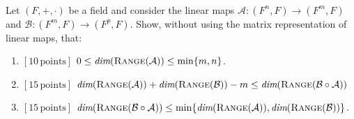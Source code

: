 \documentclass[a4paper,10.5pt]{article}
\def\dim{{\mbox{\em dim}}}
\def\range{{\mbox{\sc Range}}}
\begin{document}
\clearpage

\\
Let $(F, +, \cdot)$ be a field and consider the linear maps $\mathcal{A} : (F^n, F) \rightarrow (F^m, F)$ and  $\mathcal{B} : (F^m, F) \rightarrow (F^p, F)$. Show, without using the matrix representation of linear maps, that:

\begin{enumerate}
	\item {\bf$[10\, \text{points}]$} $0 \leq \dim(\range(\mathcal{A})) \leq \min\{m, n\}$.
	\item {\bf$[15\, \text{points}]$} $\dim(\range(\mathcal{A})) + \dim(\range(\mathcal{B})) - m \leq \dim(\range(\mathcal{B}\circ\mathcal{A}))$
	\item {\bf$[15\, \text{points}]$} $\dim(\range(\mathcal{B}\circ\mathcal{A})) \leq \min\{\dim(\range(\mathcal{A})),\dim(\range(\mathcal{B}))\}$. 
\end{enumerate}
\end{document}
